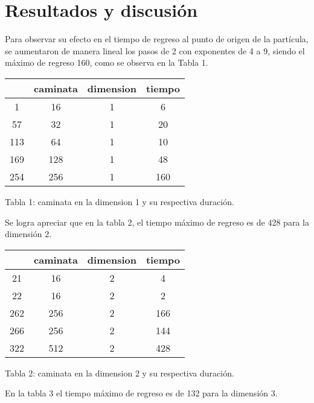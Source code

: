 \documentclass[12pt]{amsart}
\begin{document}
\section{Resultados y discusión}
Para observar su efecto en el tiempo de regreso al punto de origen de la partícula, se aumentaron de manera lineal los pasos de 2 con exponentes de 4 a 9, siendo el máximo de regreso 160, como se observa en la Tabla 1.

\bigskip
\begin{center}
 \begin{tabular}{||c c c c||} 
 \hline
     & caminata & dimension & tiempo \\ [0.5ex] 
 \hline\hline
 1 & 16 & 1 & 6 \\ 
 \hline
 57 & 32 & 1 & 20 \\
 \hline
 113 & 64 & 1 & 10 \\
 \hline
 169 & 128 & 1 & 48 \\
 \hline
 254 & 256 & 1 & 160 \\ [1ex] 
 \hline
\end{tabular}
\end{center}
\bigskip
\begin{center} \caption{Tabla 1: caminata en la dimension 1 y su respectiva duración.\label{tabla:1}}
\end{center}


\bigskip
Se logra apreciar que en la tabla 2, el tiempo máximo de regreso es de 428 para la dimensión 2.

\bigskip
\begin{center}
 \begin{tabular}{||c c c c||} 
 \hline
     & caminata & dimension & tiempo \\ [0.5ex] 
 \hline\hline
 21 & 16 & 2 & 4 \\ 
 \hline
 22 & 16 & 2 & 2 \\
 \hline
 262 & 256 & 2 & 166 \\
 \hline
 266 & 256 & 2 & 144 \\
 \hline
 322 & 512 & 2 & 428 \\ [1ex] 
 \hline
\end{tabular}
\end{center}
\bigskip
\begin{center} \caption{Tabla 2: caminata en la dimension 2 y su respectiva duración.\label{tabla:2}}
\end{center}

\bigskip
En la tabla 3 el tiempo máximo de regreso es de 132 para la dimensión 3.
\end{document}
